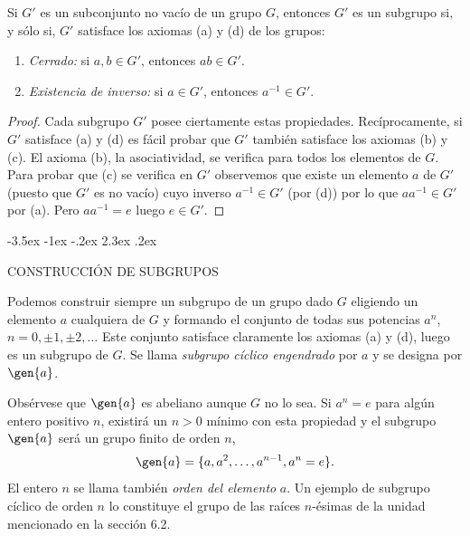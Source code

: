 \documentclass[12pt,a4paper]{book}
\makeatletter
\renewcommand\section{\@startsection{section}{1}{\z@}%
  {-3.5ex \@plus -1ex \@minus -.2ex}%
  {2.3ex \@plus .2ex}%
  {\normalfont\Large\bfseries\raggedright}}
\makeatother
\begin{document}
    \begin{teorema}
        Si $G'$ es un subconjunto no vacío de un grupo $G$, entonces $G'$ es un subgrupo
        si, y sólo si, $G'$ satisface los axiomas (a) y (d) de los grupos:
        \begin{enumerate}
            \item[(a)] \textit{Cerrado:} si $a,b\in G'$, entonces $ab\in G'$.
            \item[(d)] \textit{Existencia de inverso:} si $a\in G'$, entonces
            $a^{-1}\in G'$.
        \end{enumerate}
    \end{teorema}

    \begin{proof}
        Cada subgrupo $G'$ posee ciertamente estas propiedades. Recíprocamente, si $G'$
        satisface (a) y (d) es fácil probar que $G'$ también satisface los axiomas (b) y
        (c). El axioma (b), la asociatividad, se verifica para todos los elementos de $G$.
        Para probar que (c) se verifica en $G'$ observemos que existe un elemento $a$ de
        $G'$ (puesto que $G'$ es no vacío) cuyo inverso $a^{-1}\in G'$ (por (d)) por lo
        que $aa^{-1}\in G'$ por (a). Pero $aa^{-1}=e$ luego $e\in G'$.
    \end{proof}

    \section{CONSTRUCCIÓN DE SUBGRUPOS}

    Podemos construir siempre un subgrupo de un grupo dado $G$ eligiendo un elemento $a$
    cualquiera de $G$ y formando el conjunto de todas sus potencias $a^{n}$,
    $n=0,\pm1,\pm2,\dots$ Este conjunto satisface claramente los axiomas (a) y (d), luego
    es un subgrupo de $G$. Se llama \textit{subgrupo cíclico engendrado} por $a$ y se
    designa por $\gen{a}$.

    Obsérvese que $\gen{a}$ es abeliano aunque $G$ no lo sea. Si $a^{n}=e$ para algún entero
    positivo $n$, existirá un $n>0$ mínimo con esta propiedad y el subgrupo $\gen{a}$ será
    un grupo finito de orden $n$,
    \begin{equation*}
        \gen{a}=\{a,a^{2},\dots,a^{n-1},a^{n}=e\}.
    \end{equation*}
    El entero $n$ se llama también \textit{orden del elemento} $a$. Un ejemplo de subgrupo
    cíclico de orden $n$ lo constituye el grupo de las raíces $n$-ésimas de la unidad
    mencionado en la sección 6.2.
\end{document}
